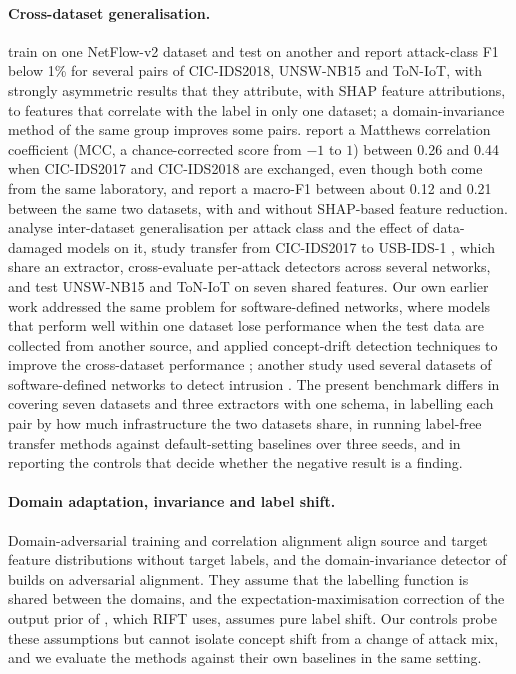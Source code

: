 \documentclass[pdflatex,sn-mathphys-num]{sn-jnl}%
\begin{document}
\paragraph{Cross-dataset generalisation.}
\citet{layeghy2023explainable} train on one NetFlow-v2 dataset and test on another and report attack-class F1 below 1\% for several pairs of CIC-IDS2018, UNSW-NB15 and ToN-IoT, with strongly asymmetric results that they attribute, with SHAP feature attributions, to features that correlate with the label in only one dataset; a domain-invariance method of the same group \citep{layeghy2023dinids} improves some pairs.
\citet{cantone2024crossdataset} report a Matthews correlation coefficient (MCC, a chance-corrected score from $-1$ to $1$) between 0.26 and 0.44 when CIC-IDS2017 and CIC-IDS2018 are exchanged, even though both come from the same laboratory, and \citet{kilic2026shap} report a macro-F1 between about 0.12 and 0.21 between the same two datasets, with and without SHAP-based feature reduction.
\citet{dhooge2020inter,dhooge2023damaged} analyse inter-dataset generalisation per attack class and the effect of data-damaged models on it, \citet{catillo2022transferability} study transfer from CIC-IDS2017 to USB-IDS-1 \citep{catillo2021usbids1}, which share an extractor, \citet{apruzzese2022cross} cross-evaluate per-attack detectors across several networks, and \citet{hossain2026assessing} test UNSW-NB15 and ToN-IoT on seven shared features.
Our own earlier work addressed the same problem for software-defined networks, where models that perform well within one dataset lose performance when the test data are collected from another source, and applied concept-drift detection techniques to improve the cross-dataset performance \citep{dang2023learning}; another study used several datasets of software-defined networks to detect intrusion \citep{dang2022multisdn}.
The present benchmark differs in covering seven datasets and three extractors with one schema, in labelling each pair by how much infrastructure the two datasets share, in running label-free transfer methods against default-setting baselines over three seeds, and in reporting the controls that decide whether the negative result is a finding.

\paragraph{Domain adaptation, invariance and label shift.}
Domain-adversarial training \citep{ganin2016dann} and correlation alignment \citep{sun2016coral} align source and target feature distributions without target labels, and the domain-invariance detector of \citet{layeghy2023dinids} builds on adversarial alignment.
They assume that the labelling function is shared between the domains, and the expectation-maximisation correction of the output prior of \citet{saerens2002adjusting}, which RIFT uses, assumes pure label shift.
Our controls probe these assumptions but cannot isolate concept shift from a change of attack mix, and we evaluate the methods against their own baselines in the same setting.
\end{document}
